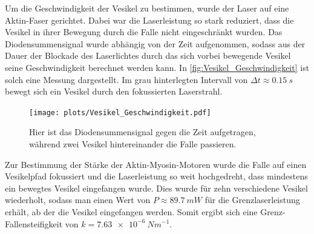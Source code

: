     Um die Geschwindigkeit der Vesikel zu bestimmen, wurde der Laser auf eine Aktin-Faser gerichtet.
    Dabei war die Laserleistung so stark reduziert, dass die Vesikel in ihrer Bewegung durch die Falle nicht eingeschränkt wurden.
    Das Diodensummensignal wurde abhängig von der Zeit aufgenommen, sodass aus der Dauer der Blockade des Laserlichtes durch das sich vorbei bewegende Vesikel seine Geschwindigkeit berechnet werden kann.
    In \autoref{fig:Vesikel_Geschwindigkeit} ist solch eine Messung dargestellt.
    Im grau hinterlegten Intervall von $\Delta t \approx \qty{0.15}{s}$ bewegt sich ein Vesikel durch den fokussierten Laserstrahl.
    \begin{figure}[ht]
        \centering\captionsetup{format=plain}
        \texttt{[image: plots/Vesikel\_Geschwindigkeit.pdf]} \vspace*{-0.5cm}
        \caption{Hier ist das Diodensummensignal gegen die Zeit aufgetragen, während zwei Vesikel hintereinander die Falle passieren.}
        \label{fig:Vesikel_Geschwindigkeit}
    \end{figure}
    \FloatBarrier

    Zur Bestimmung der Stärke der Aktin-Myosin-Motoren wurde die Falle auf einen Vesikelpfad fokussiert und die Laserleistung so weit hochgedreht, dass mindestens ein bewegtes Vesikel eingefangen wurde.
    Dies wurde für zehn verschiedene Vesikel wiederholt, sodass man einen Wert von $P \approx \qty{89.7}{mW}$ für die Grenzlaserleistung erhält, ab der die Vesikel eingefangen werden.
    Somit ergibt sich eine Grenz-Fallensteifigkeit von $k = \qty{7.63e-6}{N m^{-1}}$.
    

